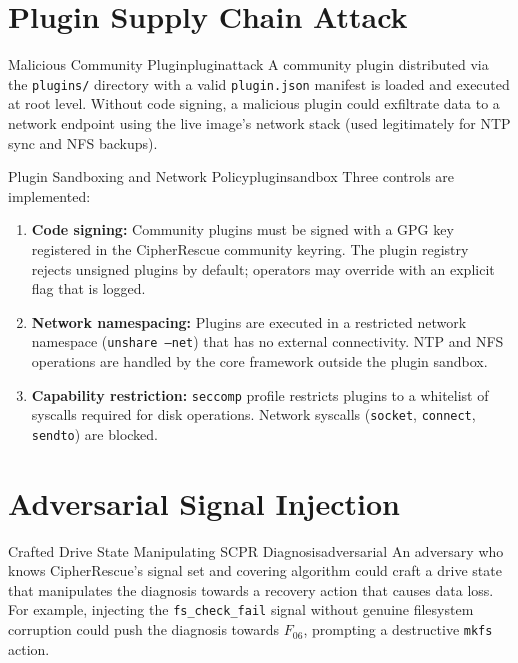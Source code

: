 \documentclass[11pt,a4paper]{report}
\begin{document}
\section{Plugin Supply Chain Attack}

\begin{edgecase}{Malicious Community Plugin}{pluginattack}
A community plugin distributed via the \texttt{plugins/} directory with a valid \texttt{plugin.json} manifest is loaded and executed at root level. Without code signing, a malicious plugin could exfiltrate data to a network endpoint using the live image's network stack (used legitimately for NTP sync and NFS backups).
\end{edgecase}

\begin{solution}{Plugin Sandboxing and Network Policy}{pluginsandbox}
Three controls are implemented:
\begin{enumerate}[noitemsep]
  \item \textbf{Code signing:} Community plugins must be signed with a GPG key registered in the CipherRescue community keyring. The plugin registry rejects unsigned plugins by default; operators may override with an explicit flag that is logged.
  \item \textbf{Network namespacing:} Plugins are executed in a restricted network namespace (\texttt{unshare --net}) that has no external connectivity. NTP and NFS operations are handled by the core framework outside the plugin sandbox.
  \item \textbf{Capability restriction:} \texttt{seccomp} profile restricts plugins to a whitelist of syscalls required for disk operations. Network syscalls (\texttt{socket}, \texttt{connect}, \texttt{sendto}) are blocked.
\end{enumerate}
\end{solution}

\section{Adversarial Signal Injection}

\begin{edgecase}{Crafted Drive State Manipulating SCPR Diagnosis}{adversarial}
An adversary who knows CipherRescue's signal set and covering algorithm could craft a drive state that manipulates the diagnosis towards a recovery action that causes data loss. For example, injecting the \texttt{fs\_check\_fail} signal without genuine filesystem corruption could push the diagnosis towards $F_{06}$, prompting a destructive \texttt{mkfs} action.
\end{edgecase}
\end{document}
